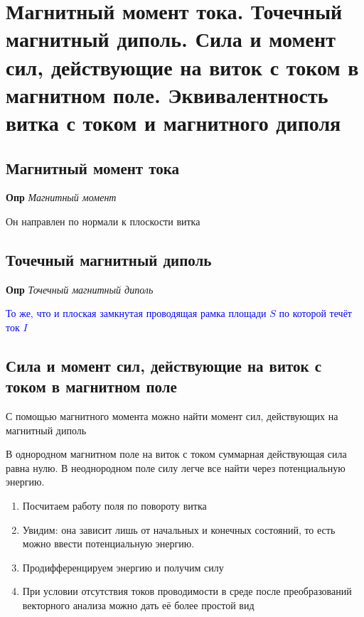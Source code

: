\documentclass[a4paper, 14pt]{article}
\begin{document}
    \section{Магнитный момент тока.
    Точечный магнитный диполь.
    Сила и момент сил, действующие на виток с током в магнитном поле.
    Эквивалентность витка с током и магнитного диполя}
    
    \subsection{Магнитный момент тока}
    
    \textbf{Опр} \textit{Магнитный момент}
    
    Он направлен по нормали к плоскости витка
    
    \subsection{Точечный магнитный диполь}
    
    \textbf{Опр} \textit{Точечный магнитный диполь}
    
    \textcolor{blue}{То же, что и плоская замкнутая проводящая рамка площади $S$ по которой течёт ток $I$}
    
    \subsection{Сила и момент сил, действующие на виток с током в магнитном поле}
    
    С помощью магнитного момента можно найти момент сил, действующих на магнитный диполь
    
    В однородном магнитном поле на виток с током суммарная действующая сила равна нулю.
    В неоднородном поле силу легче все найти через потенциальную энергию.
    
    \begin{enumerate}
        \item Посчитаем работу поля по повороту витка
        \item Увидим: она зависит лишь от начальных и конечных состояний, то есть можно ввести потенциальную энергию.
        \item Продифференцируем энергию и получим силу
        \item При условии отсутствия токов проводимости в среде после преобразований векторного анализа можно дать её
        более простой вид
    \end{enumerate}
    
\end{document}
